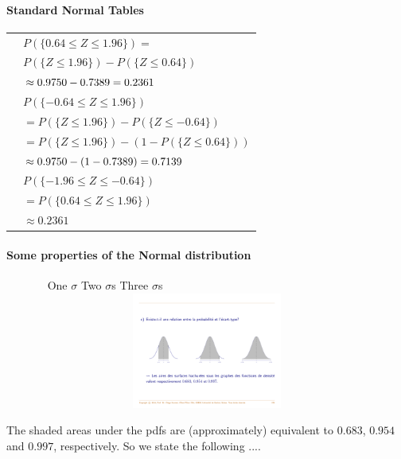 \documentclass[notes=show,smaller]{beamer}\usepackage[]{graphicx}\usepackage[]{color}
\begin{document}
\begin{frame}{\subsecname}
\framesubtitle{Standard Normal Tables}

  \begin{example}[continued]

  \begin{tabular}{ll}
  & $P(\{0.64\leq Z\leq 1.96\})=$ \\
  & $P(\{Z\leq 1.96\})-P(\{Z\leq 0.64\})$ \\
  & $\approx 0.9750-0.7389=0.2361\bigskip $ \\
  & $P(\{-0.64\leq Z\leq 1.96\})$ \\
  & $=P(\{Z\leq 1.96\})-P(\{Z\leq -0.64\})$ \\
  & $=P(\{Z\leq 1.96\})-(1-P(\{Z\leq 0.64\}))$ \\
  & $\approx0.9750-(1-0.7389)=0.7139\bigskip $ \\
  & $P(\{-1.96\leq Z\leq -0.64\})$ \\
  & $=P(\{0.64\leq Z\leq 1.96\})$ \\
  & $\approx0.2361$%
  \end{tabular}
  \end{example}
\end{frame}

\begin{frame}{\subsecname}
\framesubtitle{Some properties of the Normal distribution}

  \begin{figure}[ptb]\centering
  \ \hspace{0.6cm} One $\sigma$ \hspace{2.4cm} Two $\sigma$s \hspace{2.5cm} Three $\sigma$s \hspace{3cm}
  \includegraphics[height=1.5in, width=4.5in]{img/Areas_Normal.pdf}%
  \end{figure}%
  The shaded areas under the pdfs are (approximately) equivalent to $0.683$, $0.954$ and $0.997$,
  respectively. So we state  the following ....

\end{frame}
\end{document}
